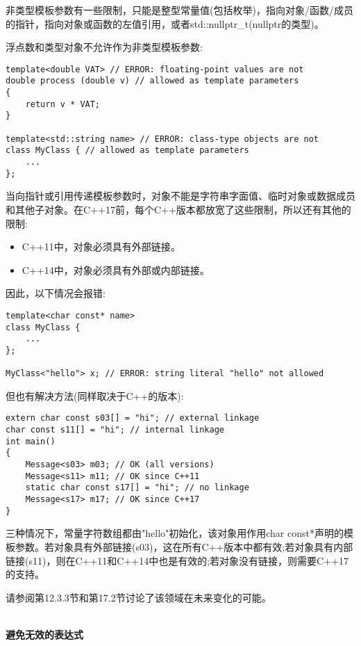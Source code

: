 非类型模板参数有一些限制，只能是整型常量值(包括枚举)，指向对象/函数/成员的指针，指向对象或函数的左值引用，或者std::nullptr\_t(nullptr的类型)。

浮点数和类型对象不允许作为非类型模板参数:

\begin{lstlisting}[style=styleCXX]
template<double VAT> // ERROR: floating-point values are not
double process (double v) // allowed as template parameters
{
	return v * VAT;
}

template<std::string name> // ERROR: class-type objects are not
class MyClass { // allowed as template parameters
	...
};
\end{lstlisting}

当向指针或引用传递模板参数时，对象不能是字符串字面值、临时对象或数据成员和其他子对象。在C++17前，每个C++版本都放宽了这些限制，所以还有其他的限制:

\begin{itemize}
\item 
C++11中，对象必须具有外部链接。

\item 
C++14中，对象必须具有外部或内部链接。
\end{itemize}

因此，以下情况会报错:

\begin{lstlisting}[style=styleCXX]
template<char const* name>
class MyClass {
	...
};

MyClass<"hello"> x; // ERROR: string literal "hello" not allowed
\end{lstlisting}

但也有解决方法(同样取决于C++的版本):

\begin{lstlisting}[style=styleCXX]
extern char const s03[] = "hi"; // external linkage
char const s11[] = "hi"; // internal linkage
int main()
{
	Message<s03> m03; // OK (all versions)
	Message<s11> m11; // OK since C++11
	static char const s17[] = "hi"; // no linkage
	Message<s17> m17; // OK since C++17
}
\end{lstlisting}

三种情况下，常量字符数组都由"hello"初始化，该对象用作用char const*声明的模板参数。若对象具有外部链接(s03)，这在所有C++版本中都有效;若对象具有内部链接(s11)，则在C++11和C++14中也是有效的;若对象没有链接，则需要C++17的支持。

请参阅第12.3.3节和第17.2节讨论了该领域在未来变化的可能。

\hspace*{\fill} \\ %
\noindent
\textbf{避免无效的表达式}

